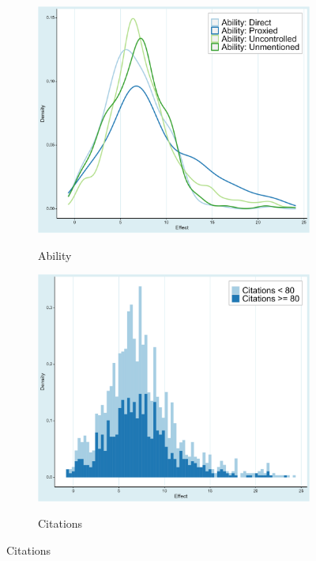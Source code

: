 \begin{figure}[!htbp]
\begin{center}
\begin{subfigure}[!htbp]{0.38\textwidth}
   \vspace{0.2cm}
   \caption{Ability}
   \vspace{-0.1cm}
   \includegraphics[width=0.95\linewidth]{Figures/Prima Facie/prima_facie_ability.png}
   \label{fig:prima_facie_ability}
\end{subfigure}
\begin{subfigure}[!htbp]{0.38\textwidth}
   \vspace{0.2cm}
   \caption{Citations}
   \vspace{-0.1cm}
   \includegraphics[width=0.95\linewidth]{Figures/Prima Facie/prima_facie_citations.png}
   \label{fig:prima_facie_citations}
\end{subfigure}


\end{center}
\end{figure}
